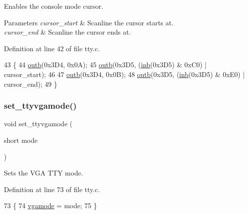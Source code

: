 Enables the console mode cursor. 


\begin{DoxyParams}{Parameters}
{\em cursor\+\_\+start} & Scanline the cursor starts at. \\
\hline
{\em cursor\+\_\+end} & Scanline the cursor ends at. \\
\hline
\end{DoxyParams}


Definition at line 42 of file tty.\+c.


\begin{DoxyCode}
43 \{
44     \hyperlink{a00158_aa37f5841c54156a4b14fc0d6f626b44f_aa37f5841c54156a4b14fc0d6f626b44f}{outb}(0x3D4, 0x0A);
45     \hyperlink{a00158_aa37f5841c54156a4b14fc0d6f626b44f_aa37f5841c54156a4b14fc0d6f626b44f}{outb}(0x3D5, (\hyperlink{a00158_a0223c8898dfec29069879dc51076e28a_a0223c8898dfec29069879dc51076e28a}{inb}(0x3D5) & 0xC0) | cursor\_start);
46  
47     \hyperlink{a00158_aa37f5841c54156a4b14fc0d6f626b44f_aa37f5841c54156a4b14fc0d6f626b44f}{outb}(0x3D4, 0x0B);
48     \hyperlink{a00158_aa37f5841c54156a4b14fc0d6f626b44f_aa37f5841c54156a4b14fc0d6f626b44f}{outb}(0x3D5, (\hyperlink{a00158_a0223c8898dfec29069879dc51076e28a_a0223c8898dfec29069879dc51076e28a}{inb}(0x3D5) & 0xE0) | cursor\_end);
49 \}
\end{DoxyCode}
\mbox{\label{a00167_aaf55ee008e2e63ca97eacae371646db7_aaf55ee008e2e63ca97eacae371646db7}} 
\subsubsection{\texorpdfstring{set\+\_\+ttyvgamode()}{set\_ttyvgamode()}}
{\footnotesize\ttfamily void set\+\_\+ttyvgamode (\begin{DoxyParamCaption}\item[{short}]{mode }\end{DoxyParamCaption})}



Sets the V\+GA T\+TY mode. 



Definition at line 73 of file tty.\+c.


\begin{DoxyCode}
73                                 \{
74     \hyperlink{a00167_af93b0649fdd1bea5b6d29ed37205aa2c_af93b0649fdd1bea5b6d29ed37205aa2c}{vgamode} = mode;
75 \}
\end{DoxyCode}
\mbox{\label{a00167_ade960b1320324706aac6c00cc6b1b2fe_ade960b1320324706aac6c00cc6b1b2fe}} 
